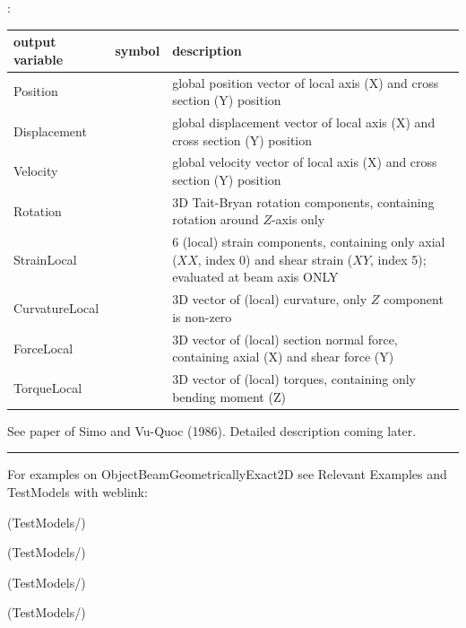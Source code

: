 :
\begin{center}
\footnotesize
\begin{longtable}{| p{5cm} | p{5cm} | p{6cm} |} 
\hline
\bf output variable & \bf symbol & \bf description \\ \hline
Position &  & global position vector of local axis (X) and cross section (Y) position\\ \hline
Displacement &  & global displacement vector of local axis (X) and cross section (Y) position\\ \hline
Velocity &  & global velocity vector of local axis (X) and cross section (Y) position\\ \hline
Rotation &  & 3D Tait-Bryan rotation components, containing rotation around $Z$-axis only\\ \hline
StrainLocal &  & 6 (local) strain components, containing only axial ($XX$, index 0) and shear strain ($XY$, index 5); evaluated at beam axis ONLY\\ \hline
CurvatureLocal &  & 3D vector of (local) curvature, only $Z$ component is non-zero\\ \hline
ForceLocal &  & 3D vector of (local) section normal force, containing axial (X) and shear force (Y)\\ \hline
TorqueLocal &  & 3D vector of (local) torques, containing only bending moment (Z)\\ \hline
\end{longtable}
\end{center}
 \noindent
    See paper of Simo and Vu-Quoc (1986).
    Detailed description coming later.
\vspace{6pt}\par\noindent\rule{\textwidth}{0.4pt}
%
\noindent For examples on ObjectBeamGeometricallyExact2D see Relevant Examples and TestModels with weblink:
\bi
\item {} (TestModels/)
\item {} (TestModels/)
\item {} (TestModels/)
\item {} (TestModels/)

